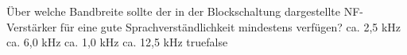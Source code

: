     {Über welche Bandbreite sollte der in der Blockschaltung dargestellte NF-Verstärker für eine gute Sprachverständlichkeit mindestens verfügen?}
    {ca. 2,5 kHz}
    {ca. 6,0 kHz}
    {ca. 1,0 kHz}
    {ca. 12,5 kHz}
    {true}{false}